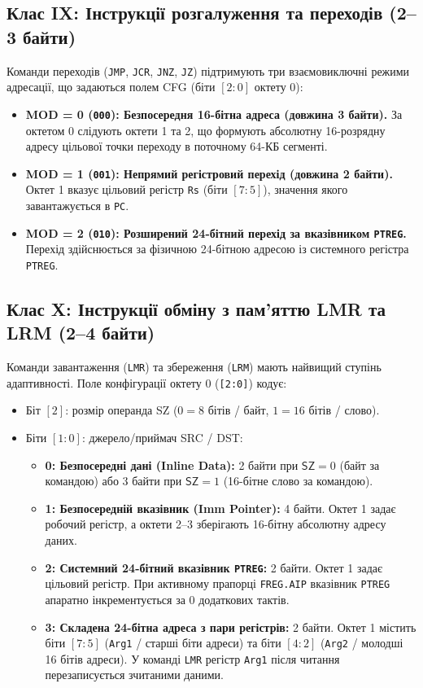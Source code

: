 \documentclass[11pt,a4paper]{article}
\newcommand{\reg}[1]{\texttt{#1}}
\newcommand{\bits}[1]{\texttt{#1}}
\newcommand{\field}[1]{\textsf{#1}}
\begin{document}
\subsection{Клас IX: Інструкції розгалуження та переходів (2--3 байти)}
Команди переходів (\texttt{JMP}, \texttt{JCR}, \texttt{JNZ}, \texttt{JZ}) підтримують три взаємовиключні режими адресації, що задаються полем \field{CFG} (біти $[2:0]$ октету 0):
\begin{itemize}
  \item \textbf{MOD = 0 (\bits{000}): Безпосередня 16-бітна адреса (довжина 3 байти).} За октетом 0 слідують октети 1 та 2, що формують абсолютну 16-розрядну адресу цільової точки переходу в поточному 64-КБ сегменті.
  \item \textbf{MOD = 1 (\bits{001}): Непрямий регістровий перехід (довжина 2 байти).} Октет 1 вказує цільовий регістр \reg{Rs} (біти $[7:5]$), значення якого завантажується в \reg{PC}.
  \item \textbf{MOD = 2 (\bits{010}): Розширений 24-бітний перехід за вказівником \reg{PTREG}.} Перехід здійснюється за фізичною 24-бітною адресою із системного регістра \reg{PTREG}.
\end{itemize}

\subsection{Клас X: Інструкції обміну з пам'яттю LMR та LRM (2--4 байти)}
Команди завантаження (\texttt{LMR}) та збереження (\texttt{LRM}) мають найвищий ступінь адаптивності. 
Поле конфігурації октету 0 (\bits{[2:0]}) кодує:
\begin{itemize}
  \item Біт $[2]$: розмір операнда \field{SZ} ($0 = 8$ бітів / байт, $1 = 16$ бітів / слово).
  \item Біти $[1:0]$: джерело/приймач \field{SRC} / \field{DST}:
    \begin{itemize}
      \item \textbf{0: Безпосередні дані (Inline Data):} 2 байти при $\field{SZ}=0$ (байт за командою) або 3 байти при $\field{SZ}=1$ (16-бітне слово за командою).
      \item \textbf{1: Безпосередній вказівник (Imm Pointer):} 4 байти. Октет 1 задає робочий регістр, а октети 2--3 зберігають 16-бітну абсолютну адресу даних.
      \item \textbf{2: Системний 24-бітний вказівник \reg{PTREG}:} 2 байти. Октет 1 задає цільовий регістр. При активному прапорці \texttt{FREG.AIP} вказівник \reg{PTREG} апаратно інкрементується за 0 додаткових тактів.
      \item \textbf{3: Складена 24-бітна адреса з пари регістрів:} 2 байти. Октет 1 містить біти $[7:5]$ (\reg{Arg1} / старші біти адреси) та біти $[4:2]$ (\reg{Arg2} / молодші 16 бітів адреси). У команді \texttt{LMR} регістр \reg{Arg1} після читання перезаписується зчитаними даними.
    \end{itemize}
\end{itemize}
\end{document}
